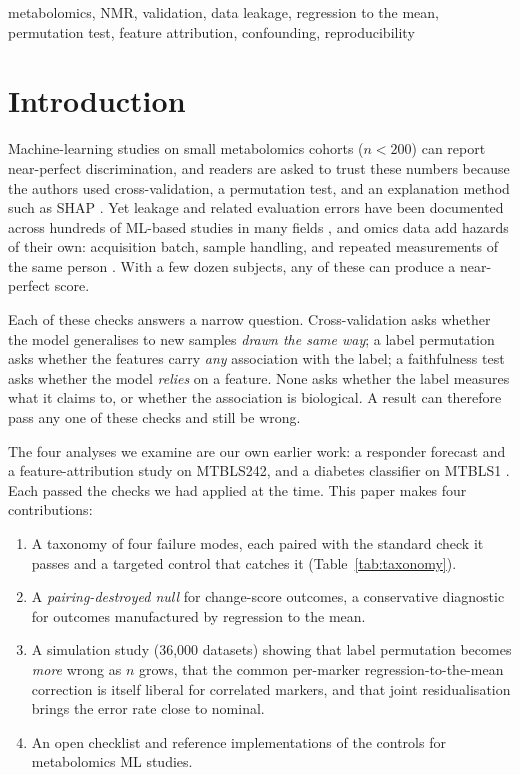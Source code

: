 \documentclass[conference]{IEEEtran}
\begin{document}
\begin{IEEEkeywords}
metabolomics, NMR, validation, data leakage, regression to the mean,
permutation test, feature attribution, confounding, reproducibility
\end{IEEEkeywords}

\section{Introduction}
\label{sec:intro}

Machine-learning studies on small metabolomics cohorts ($n<200$) can report
near-perfect discrimination, and readers are asked to trust these numbers
because the authors used cross-validation, a permutation test, and an
explanation method such as SHAP \cite{lundberg2017}. Yet leakage and related
evaluation errors have been documented across hundreds of ML-based studies in
many fields \cite{kapoor2023}, and omics data add hazards of their own:
acquisition batch, sample handling, and repeated measurements of the same
person \cite{leek2010}. With a few dozen subjects, any of these can produce a
near-perfect score.

Each of these checks answers a narrow question. Cross-validation asks whether
the model generalises to new samples \emph{drawn the same way}; a label
permutation asks whether the features carry \emph{any} association with the
label; a faithfulness test asks whether the model \emph{relies} on a feature.
None asks whether the label measures what it claims to, or whether the
association is biological. A result can therefore pass any one of these checks
and still be wrong.

The four analyses we examine are our own earlier work: a responder forecast
and a feature-attribution study on MTBLS242, and a diabetes classifier on
MTBLS1 \cite{repo_forecast, repo_roar, repo_bridge}. Each passed the checks we
had applied at the time. This paper makes four contributions:
\begin{enumerate}
  \item A taxonomy of four failure modes, each paired with the standard check
        it passes and a targeted control that catches it
        (Table~\ref{tab:taxonomy}).
  \item A \emph{pairing-destroyed null} for change-score outcomes, a
        conservative diagnostic for outcomes manufactured by regression to
        the mean.
  \item A simulation study (36{,}000 datasets) showing that label permutation
        becomes \emph{more} wrong as $n$ grows, that the common per-marker
        regression-to-the-mean correction is itself liberal for correlated
        markers, and that joint residualisation brings the error rate close
        to nominal.
  \item An open checklist and reference implementations of the controls for
        metabolomics ML studies.
\end{enumerate}
\end{document}
